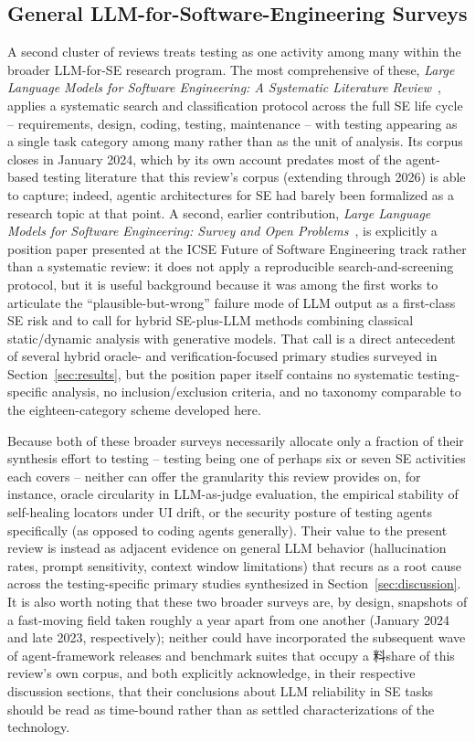 \subsection{General LLM-for-Software-Engineering Surveys}
\label{subsec:prior-surveys-llmse}

A second cluster of reviews treats testing as one activity among many
within the broader LLM-for-SE research program. The most
comprehensive of these, \emph{Large Language Models for Software
Engineering: A Systematic Literature Review}~\cite{slr0022024}, applies a systematic search and
classification protocol across the full SE life cycle -- requirements,
design, coding, testing, maintenance -- with testing appearing as a
single task category among many rather than as the unit of analysis.
Its corpus closes in January 2024, which by its own account predates
most of the agent-based testing literature that this review's corpus
(extending through 2026) is able to capture; indeed, agentic
architectures for SE had barely been formalized as a research topic
at that point. A second, earlier contribution,
\emph{Large Language Models for
Software Engineering: Survey and Open Problems}~\cite{slr0032023}, is explicitly a
position paper presented at the ICSE Future of Software Engineering
track rather than a systematic review: it does not apply a
reproducible search-and-screening protocol, but it is useful
background because it was among the first works to articulate the
``plausible-but-wrong'' failure mode of LLM output as a first-class
SE risk and to call for hybrid SE-plus-LLM methods combining
classical static/dynamic analysis with generative models. That call
is a direct antecedent of several hybrid oracle- and
verification-focused primary studies surveyed in
Section~\ref{sec:results}, but the position paper itself contains no
systematic testing-specific analysis, no inclusion/exclusion
criteria, and no taxonomy comparable to the eighteen-category scheme
developed here.

Because both of these broader surveys necessarily allocate only a
fraction of their synthesis effort to testing -- testing being one of
perhaps six or seven SE activities each covers -- neither can offer
the granularity this review provides on, for instance, oracle
circularity in LLM-as-judge evaluation, the empirical stability of
self-healing locators under UI drift, or the security posture of
testing agents specifically (as opposed to coding agents generally).
Their value to the present review is instead as adjacent evidence on
general LLM behavior (hallucination rates, prompt sensitivity, context
window limitations) that recurs as a root cause across the
testing-specific primary studies synthesized in
Section~\ref{sec:discussion}. It is also worth noting that these two
broader surveys are, by design, snapshots of a fast-moving field taken
roughly a year apart from one another (January 2024 and late 2023,
respectively); neither could have incorporated the subsequent wave of
agent-framework releases and benchmark suites that occupy a
料share of this review's own corpus, and both explicitly
acknowledge, in their respective discussion sections, that their
conclusions about LLM reliability in SE tasks should be read as
time-bound rather than as settled characterizations of the technology.

